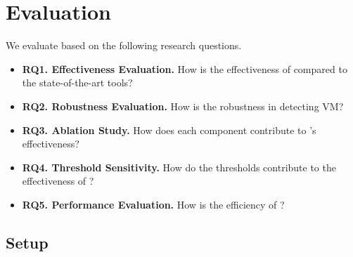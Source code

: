 
\section{Evaluation}

We evaluate \tool based on the following research questions.



\begin{itemize}[leftmargin=*]
  \item \textbf{RQ1. Effectiveness Evaluation.} How is the effectiveness of \tool compared to the state-of-the-art tools?
  \item \textbf{RQ2. Robustness Evaluation.} How is the robustness \tool in detecting VM?
  \item \textbf{RQ3. Ablation Study.} How does each component contribute to \tool's effectiveness?
  \item \textbf{RQ4. Threshold Sensitivity.} How do the thresholds contribute to the effectiveness of \tool?
  \item \textbf{RQ5. Performance Evaluation.} How is the efficiency of \tool?
\end{itemize}
\subsection{Setup}
